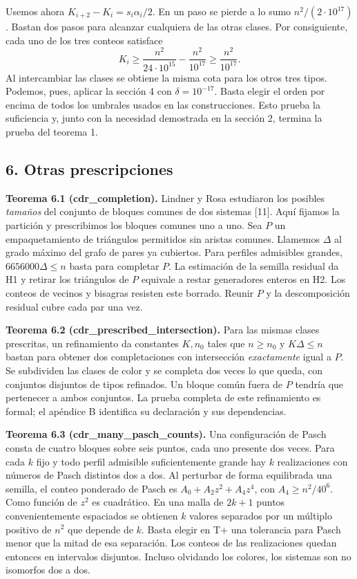 \documentclass[spanish,11pt,a4paper]{article}
\begin{document}
Usemos ahora \(K_{i+2}-K_i=s_i\alpha_i/2\). En un paso se pierde a lo sumo \(n^2/(2\cdot10^{17})\). Bastan dos pasos para alcanzar cualquiera de las otras clases. Por consiguiente, cada uno de los tres conteos satisface \[K_i\ge\frac{n^2}{24\cdot10^{15}}-\frac{n^2}{10^{17}}\ge\frac{n^2}{10^{17}}.\] Al intercambiar las clases se obtiene la misma cota para los otros tres tipos. Podemos, pues, aplicar la sección 4 con \(\delta=10^{-17}\). Basta elegir el orden por encima de todos los umbrales usados en las construcciones. Esto prueba la suficiencia y, junto con la necesidad demostrada en la sección 2, termina la prueba del teorema 1.

\subsection{6. Otras prescripciones}\label{otras-prescripciones}

\textbf{Teorema 6.1 (cdr\_completion).} Lindner y Rosa estudiaron los posibles \emph{tamaños} del conjunto de bloques comunes de dos sistemas {[}11{]}. Aquí fijamos la partición y prescribimos los bloques comunes uno a uno. Sea \(P\) un empaquetamiento de triángulos permitidos sin aristas comunes. Llamemos \(\Delta\) al grado máximo del grafo de pares ya cubiertos. Para perfiles admisibles grandes, \(6656000\Delta\le n\) basta para completar \(P\). La estimación de la semilla residual da H1 y retirar los triángulos de \(P\) equivale a restar generadores enteros en H2. Los conteos de vecinos y bisagras resisten este borrado. Reunir \(P\) y la descomposición residual cubre cada par una vez.

\textbf{Teorema 6.2 (cdr\_prescribed\_intersection).} Para las mismas clases prescritas, un refinamiento da constantes \(K,n_0\) tales que \(n\ge n_0\) y \(K\Delta\le n\) bastan para obtener dos completaciones con intersección \emph{exactamente} igual a \(P\). Se subdividen las clases de color y se completa dos veces lo que queda, con conjuntos disjuntos de tipos refinados. Un bloque común fuera de \(P\) tendría que pertenecer a ambos conjuntos. La prueba completa de este refinamiento es formal; el apéndice B identifica su declaración y sus dependencias.

\textbf{Teorema 6.3 (cdr\_many\_pasch\_counts).} Una configuración de Pasch consta de cuatro bloques sobre seis puntos, cada uno presente dos veces. Para cada \(k\) fijo y todo perfil admisible suficientemente grande hay \(k\) realizaciones con números de Pasch distintos dos a dos. Al perturbar de forma equilibrada una semilla, el conteo ponderado de Pasch es \(A_0+A_2z^2+A_4z^4\), con \(A_4\ge n^2/40^6\). Como función de \(z^2\) es cuadrático. En una malla de \(2k+1\) puntos convenientemente espaciados se obtienen \(k\) valores separados por un múltiplo positivo de \(n^2\) que depende de \(k\). Basta elegir en T+ una tolerancia para Pasch menor que la mitad de esa separación. Los conteos de las realizaciones quedan entonces en intervalos disjuntos. Incluso olvidando los colores, los sistemas son no isomorfos dos a dos.
\end{document}
